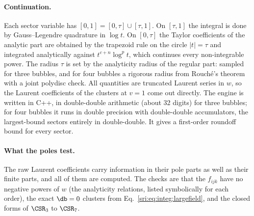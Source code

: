 \paragraph{Continuation.} Each sector variable has $[0,1]=[0,\tau]\cup[\tau,1]$. On $[\tau,1]$ the integral is done by
Gauss--Legendre quadrature in $\log t$. On $[0,\tau]$ the Taylor coefficients of the analytic part are obtained by the
trapezoid rule on the circle $|t|=\tau$ and integrated analytically against $t^{c+n}\log^pt$, which continues every
non-integrable power. The radius $\tau$ is set by the analyticity radius of the regular part: sampled for three bubbles,
and for four bubbles a rigorous radius from Rouch\'e's theorem with a joint polydisc check. All quantities are
truncated Laurent series in $w$, so the Laurent coefficients of the clusters at $v=1$ come out directly. The engine is
written in C++, in double-double arithmetic (about 32 digits) for three bubbles; for four bubbles it runs in double
precision with double-double accumulators, the largest-bound sectors entirely in double-double. It gives a first-order
roundoff bound for every sector.

\paragraph{What the poles test.} The raw Laurent coefficients carry information in their pole parts as well as their
finite parts, and all of them are computed. The checks are that the $f_{ijk}$ have no negative powers of $w$ (the
analyticity relations, listed symbolically for each order), the exact $\db=0$ clusters from
Eq.~\eqref{sri:eq:integ:largefield}, and the closed forms of $\CSR_3$ to $\CSR_7$.

